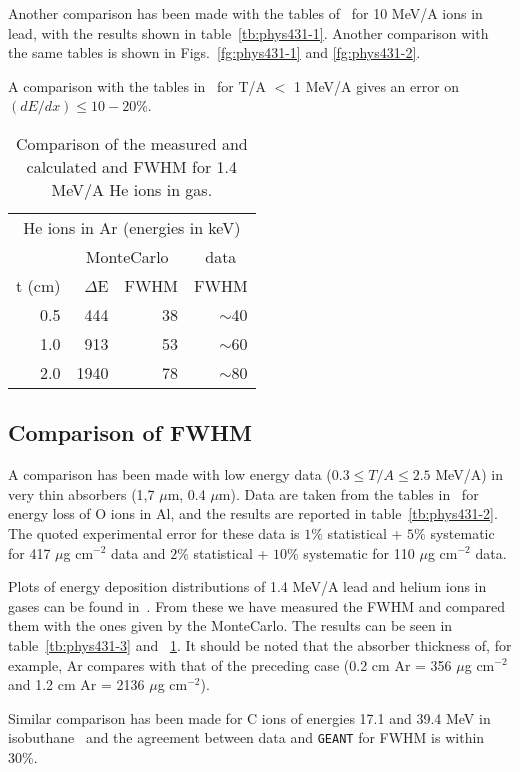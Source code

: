Another comparison has been made with the tables of~\cite{bib-HUBE} 
for 10 MeV/A ions in lead, with
the results shown in table~\ref{tb:phys431-1}.
Another comparison with the same tables is shown in Figs.~\ref{fg:phys431-1}
and \ref{fg:phys431-2}.

A comparison with the tables in~\cite{bib-ANZI,bib-ANZ1} for T/A $<$ 1 MeV/A
gives  an error on $(dE/dx) \leq 10-20\%$.

\begin{table}
\begin{centering}
\begin{tabular}{|r|rr|r|}
\hline
\multicolumn{4}{|c|}{He ions in Ar (energies in keV)} \\
& \multicolumn{2}{c}{MonteCarlo} & \multicolumn{1}{c|}{data} \\
t (cm) & 
$\Delta$E & FWHM & FWHM \\
\hline
0.5 & 444 & 38 & $\sim$40 \\
1.0 & 913 & 53 & $\sim$60 \\
2.0 & 1940 & 78 & $\sim$80 \\
\hline
\end{tabular}
\caption{Comparison of the measured and calculated and FWHM
for 1.4 MeV/A He ions in gas.}
\end{centering}
\label{tb:phys431-4}
\end{table}

\subsection{Comparison of FWHM}

A comparison has been made with 
low energy data ($0.3 \leq T/A \leq 2.5$ MeV/A) in very
thin absorbers (1,7 $\mu$m, 0.4 $\mu$m). Data are taken from
the tables in~\cite{bib-TSCH} for
energy loss of O ions in Al, and the
results are reported in table~\ref{tb:phys431-2}. The quoted experimental 
error for these data is $1\%$ statistical + $5\%$ systematic for 
417 $\mu$g cm$^{-2}$ data and $2\%$ statistical + $10\%$ systematic for
110 $\mu$g cm$^{-2}$ data. 

Plots of energy deposition distributions of 1.4 MeV/A lead and helium
ions in gases can be found in~\cite{bib-GEIS}. 
From these we have measured the FWHM and compared them with the ones given
by the MonteCarlo. The results can be seen in table~\ref{tb:phys431-3}
and ~\ref{tb:phys431-4}. It
should be noted that the absorber thickness of, for example, Ar compares
with that of the preceding case (0.2 cm Ar = 356 $\mu$g cm$^{-2}$ and
1.2 cm Ar = 2136 $\mu$g cm$^{-2}$).


Similar comparison has been made for C ions of energies 17.1 and 39.4 MeV in 
isobuthane~\cite{bib-SCHM} and the agreement between data and {\tt GEANT}
for FWHM is within 30\%.
